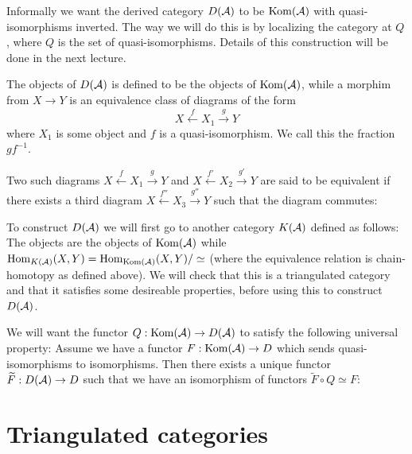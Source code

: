 \documentclass[a4paper, UKenglish]{report}
\begin{document}
Informally we want the derived category $D(\mathcal{A})$ to be $\operatorname{Kom}(\mathcal{A})$ with quasi-isomorphisms inverted. The way we will do this is by localizing the category at $Q$, where $Q$ is the set of quasi-isomorphisms. Details of this construction will be done in the next lecture.

The objects of $D(\mathcal{A})$ is defined to be the objects of $\operatorname{Kom}(\mathcal{A})$, while a morphim from $X \to Y$ is an equivalence class of diagrams of the form
\[ X \xleftarrow{f} X_1 \xrightarrow{g} Y \]
where $X_1$ is some object and $f$ is a quasi-isomorphism. We call this the fraction $gf^{-1}$.

Two such diagrams $ X \xleftarrow{f} X_1 \xrightarrow{g} Y$ and $ X \xleftarrow{f'} X_2 \xrightarrow{g'} Y$ are said to be equivalent if there exists a third diagram $ X \xleftarrow{f''} X_3 \xrightarrow{g''} Y$ such that the diagram commutes:






To construct $D(\mathcal{A})$ we will first go to another category $K(\mathcal{A})$ defined as follows: The objects are the objects of $\operatorname{Kom}(\mathcal{A})$ while $\operatorname{Hom}_{K(\mathcal{A})}(X,Y) = \operatorname{Hom}_{\operatorname{Kom}(\mathcal{A})}(X,Y) / \simeq$ (where the equivalence relation is chain-homotopy as defined above). We will check that this is a triangulated category and that it satisfies some desireable properties, before using this to construct $D(\mathcal{A})$.

We will want the functor $Q: \operatorname{Kom}(\mathcal{A}) \to D(\mathcal{A})$ to satisfy the following universal property: Assume we have a functor $F: \operatorname{Kom} (\mathcal{A}) \to D$ which sends quasi-isomorphisms to isomorphisms. Then there exists a unique functor $\widetilde{F}: D(\mathcal{A}) \to D$ such that we have an isomorphism of functors $\widetilde{F} \circ Q \simeq F$:


\section{Triangulated categories}
\end{document}
